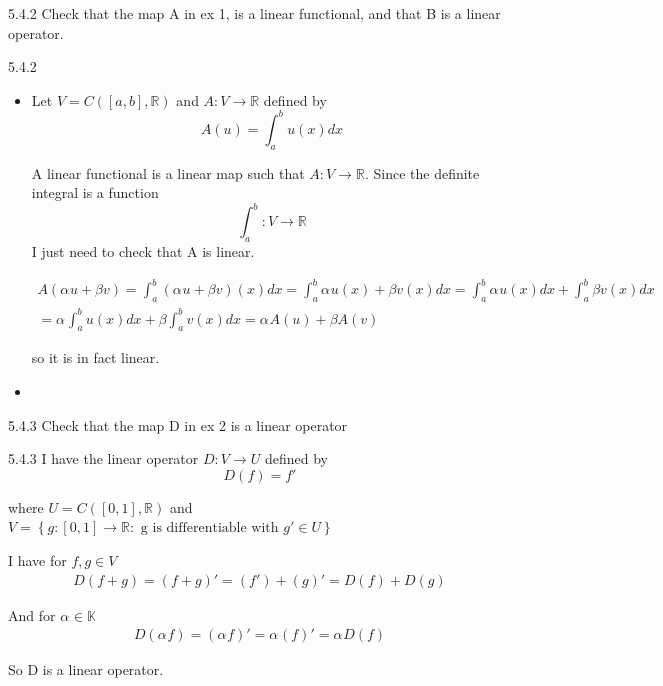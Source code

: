 \documentclass[a4paper,norsk]{article}
\begin{document}
\begin{oppgavebox}{5.4.2}{}
Check that the map A in ex 1, is a linear functional, and that B is a linear operator.
\begin{proofbox}{5.4.2}{}
    \begin{itemize}
        \item[Operator A] Let $ V = C \left( \left[ a, b \right] , \mathbb{R} \right)  $ and $ A : V \to \mathbb{R} $ defined by
        \[
            A(u) = \int_{a}^{b} u(x) dx     
        \]
        
        A linear functional is a linear map such that $ A : V \to \mathbb{R} $. Since the definite integral is a function
        \[
            \int_{a}^{b} : V \to \mathbb{R} 
        \]
        I just need to check that A is linear. 

        \begin{align*}
            A \left( \alpha_{}^{} u + \beta v \right) = \int_{a}^{b} \left( \alpha_{}^{} u + \beta v \right)  (x) dx = \int_{a}^{b} \alpha_{}^{} u(x) + \beta v(x) dx = \int_{a}^{b} \alpha_{}^{} u(x) dx + \int_{a}^{b} \beta  v(x) dx \\
            = \alpha_{}^{} \int_{a}^{b} u(x) dx +  \beta \int_{a}^{b}    v(x) dx = \alpha_{}^{} A(u) + \beta A(v)
        \end{align*}
        
        so it is in fact linear.


        \item[Operator B]
        
    \end{itemize}
\end{proofbox}
\end{oppgavebox}

\begin{oppgavebox}{5.4.3}{}
Check that the map D in ex 2 is a linear operator
\begin{proofbox}{5.4.3}{}
    I have the linear operator $ D : V \to U $ defined by
    \[
        D(f) = f'
    \]
    
    where $ U = C \left( \left[ 0, 1 \right] , \mathbb{R} \right)  $ and $ V = \left\{ g : \left[ 0, 1 \right] \to \mathbb{R} : \text{ g is differentiable with } g' \in U \right\}  $ 



    I have for $ f, g \in V$ 
    \begin{align*}
        D \left( f + g \right) = \left( f+g \right)' = \left( f' \right) + \left( g \right) ' = D(f) + D(g)
    \end{align*}


    And for $ \alpha_{}^{} \in \mathbb{K} $ 
    \begin{align*}
        D \left( \alpha_{}^{} f \right) = \left( \alpha_{}^{} f \right) ' = \alpha_{}^{} \left( f \right) ' = \alpha_{}^{} D (f)
    \end{align*}
    
    So D is a linear operator.
    
\end{proofbox}
\end{oppgavebox}
\end{document}
